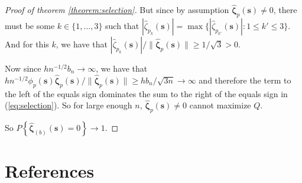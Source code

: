 \documentclass[authoryear, review, 11pt]{elsarticle}
\begin{document}
\begin{proof}[Proof of theorem \ref{theorem:selection}]
            But since by assumption $\hat{\bm{\zeta}}_p (\bm{s}) \ne 0$, there must be some $k \in \{ 1, \dots, 3 \}$ such that $ | \hat{\zeta}_{p_k} (\bm{s}) | = \max \{ | \hat{\zeta}_{p_{k'}} (\bm{s}) | : 1 \le k' \le 3 \} $. And for this $k$, we have that $| \hat{\zeta}_{p_k} (\bm{s}) | / \| \hat{\bm{\zeta}}_p (\bm{s}) \| \ge 1 / \sqrt{3} > 0$.

            Now since $h n^{-1/2} b_n \to \infty$, we have that $h n^{-1/2} \phi_p(\bm{s}) \hat{\bm{\zeta}}_p (\bm{s}) / \| \hat{\bm{\zeta}}_p (\bm{s}) \| \ge h b_n / \sqrt{3n} \to \infty$ and therefore the term to the left of the equals sign dominates the sum to the right of the equals sign in (\ref{eq:selection}). So for large enough $n$, $\hat{\bm{\zeta}}_p (\bm{s}) \ne 0$ cannot maximize $Q$.
        
            So $P \left\{ \hat{\bm{\zeta}}_{(b)} (\bm{s}) = 0 \right\} \to 1$.
        \end{proof}


\section{References}


\end{document}
